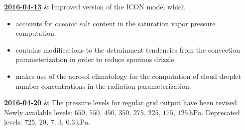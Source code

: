 \begin{vtimeline}[description={text width=0.78\textwidth}, 
 row sep=3ex, 
 add bottom line,
 line offset=10pt,
 timeline color=colorBlue,
 timeline color2=colorRed]
  \href{http://www.dwd.de/DE/fachnutzer/forschung_lehre/numerische_wettervorhersage/nwv_aenderungen/_functions/DownloadBox_modellaenderungen/icon/pdf_2016/pdf_icon_13_04_2016.pdf?__blob=publicationFile&v=3}
         {\textbf{2016-04-13}} & Improved version of the ICON model which
                      \small
                      \begin{itemize}
                       \item accounts for oceanic salt content in the saturation vapor pressure computation.
                       \item contains modifications to the detrainment tendencies from the convection parameterization in order to reduce spurious drizzle.
                       \item makes use of the aerosol climatology for the computation of cloud droplet number concentrations in the radiation parameterization.
                      \end{itemize}
                      \endlr
{}  \href{http://www.dwd.de/DE/fachnutzer/forschung_lehre/numerische_wettervorhersage/nwv_aenderungen/_functions/DownloadBox_modellaenderungen/icon/pdf_2016/pdf_icon_20_04_2016.pdf?__blob=publicationFile&v=2}
         {\textbf{2016-04-20}} & The pressure levels for regular grid output have been revised. 
                      Newly available levels: $650$, $550$, $450$, $350$, $275$, $225$, $175$, $125\,\mathrm{hPa}$. 
                      Deprecated levels: $725$, $20$, $7$, $3$, $0.3\,\mathrm{hPa}$.\endlr
\end{vtimeline}